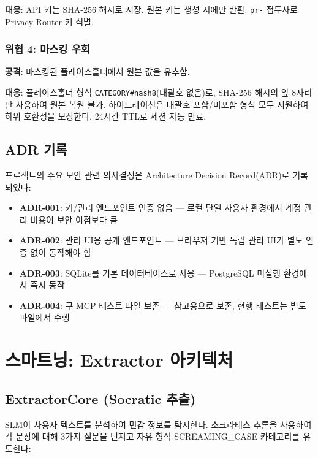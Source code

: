 \documentclass[11pt,a4paper]{article}
\begin{document}
\textbf{대응}: API 키는 SHA-256 해시로 저장. 원본 키는 생성 시에만 반환. \texttt{pr-} 접두사로 Privacy Router 키 식별.

\subsubsection{위협 4: 마스킹 우회}

\textbf{공격}: 마스킹된 플레이스홀더에서 원본 값을 유추함.

\textbf{대응}: 플레이스홀더 형식 \texttt{CATEGORY\#hash8}(대괄호 없음)로, SHA-256 해시의 앞 8자리만 사용하여 원본 복원 불가. 하이드레이션은 대괄호 포함/미포함 형식 모두 지원하여 하위 호환성을 보장한다. 24시간 TTL로 세션 자동 만료.

\subsection{ADR 기록}

프로젝트의 주요 보안 관련 의사결정은 Architecture Decision Record(ADR)로 기록되었다:

\begin{itemize}[nosep]
  \item \textbf{ADR-001}: 키/관리 엔드포인트 인증 없음 — 로컬 단일 사용자 환경에서 계정 관리 비용이 보안 이점보다 큼
  \item \textbf{ADR-002}: 관리 UI용 공개 엔드포인트 — 브라우저 기반 독립 관리 UI가 별도 인증 없이 동작해야 함
  \item \textbf{ADR-003}: SQLite를 기본 데이터베이스로 사용 — PostgreSQL 미실행 환경에서 즉시 동작
  \item \textbf{ADR-004}: 구 MCP 테스트 파일 보존 — 참고용으로 보존, 현행 테스트는 별도 파일에서 수행
\end{itemize}

\section{스마트닝: Extractor 아키텍처}

\subsection{ExtractorCore (Socratic 추출)}

SLM이 사용자 텍스트를 분석하여 민감 정보를 탐지한다. 소크라테스 추론을 사용하여 각 문장에 대해 3가지 질문을 던지고 자유 형식 SCREAMING\_CASE 카테고리를 유도한다:
\end{document}
